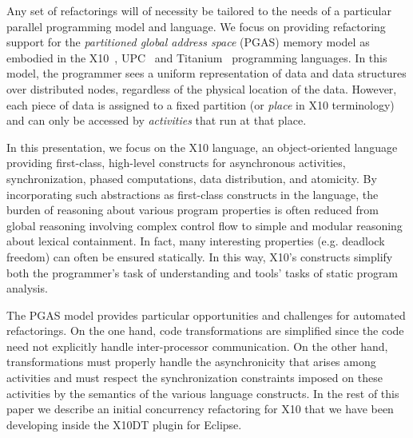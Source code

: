 Any set of refactorings will of necessity be tailored to the needs of a particular
parallel programming model and language.
We focus on providing refactoring support for the
\emph{partitioned global address space} (PGAS) memory model as
embodied in the X10~\cite{X10,Charles05}, UPC~\cite{ElGhazawi03} and
Titanium~\cite{Yelick98} programming languages.  In this model, the
programmer sees a uniform 
representation of data and data structures over distributed nodes, regardless
of the physical location of the data.  However, each piece of data is
assigned to a fixed partition (or {\em place} in X10 terminology)
and can only be accessed by {\em activities}
that run at that place.

In this presentation, we focus on the X10 language, an object-oriented language
providing first-class, high-level constructs for asynchronous activities, synchronization,
phased computations, data distribution, and atomicity.
By incorporating such abstractions as first-class constructs in the language,
the burden of reasoning about various program properties is often reduced
from global reasoning involving complex control flow to simple and modular
reasoning about lexical containment.
In fact, many interesting properties (e.g. deadlock freedom) can often
be ensured statically.
In this way, X10's constructs simplify both the programmer's task of
understanding and tools' tasks of static program analysis.

The PGAS model provides particular opportunities and challenges for
automated refactorings.  On the one hand, code transformations are
simplified since the code need not explicitly handle inter-processor
communication.  
On the other hand, transformations must properly handle the
asynchronicity that arises among activities and must respect
the synchronization constraints imposed on these activities by the
semantics of the various language constructs. 
In the rest of this paper we describe an initial concurrency
refactoring for X10 that we
have been developing inside the X10DT plugin for Eclipse.

